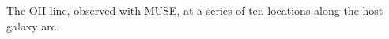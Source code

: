 \label{fig:MUSEOIISequence}
The OII line, observed with MUSE, at a series of ten locations along
the \spock host galaxy arc.

